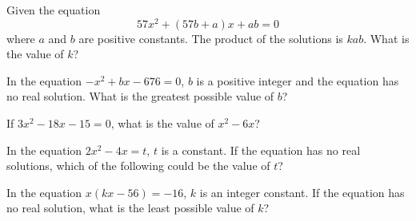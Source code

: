 \vspace{5em}

\noindent\markforreview
\vspace{1em}

Given the equation  
\[
57x^2 + (57b + a)x + ab = 0
\]  
where \(a\) and \(b\) are positive constants. The product of the solutions is \(kab\).  
What is the value of \(k\)?

\vspace{0.75em}


\newpage
\noindent\markforreview
\vspace{1em}

In the equation \(-x^2 + bx - 676 = 0\),  
\(b\) is a positive integer and the equation has no real solution.  
What is the greatest possible value of \(b\)?

\vspace{0.75em}



\vspace{5em}

\noindent\markforreview
\vspace{1em}

If \(3x^2 - 18x - 15 = 0\), what is the value of \(x^2 - 6x\)?

\vspace{5em}



\noindent\markforreview
\vspace{1em}

In the equation \(2x^2 - 4x = t\), \(t\) is a constant.  
If the equation has no real solutions, which of the following could be the value of \(t\)?

\vspace{0.75em}


\newpage

\noindent\markforreview
\vspace{1em}

In the equation \(x(kx - 56) = -16\), \(k\) is an integer constant.  
If the equation has no real solution, what is the least possible value of \(k\)?

\vspace{3em}

\noindent\markforreview
\vspace{1em}

